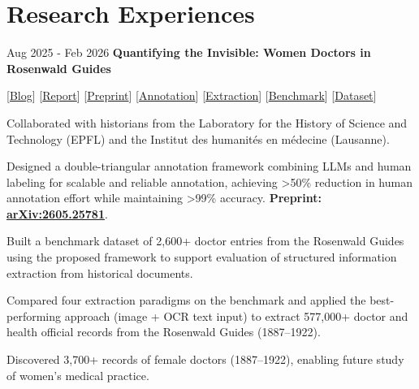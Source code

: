 \section{Research Experiences}


        \begin{twocolentry}{
            Aug 2025 - Feb 2026
        }
            \textbf{Quantifying the Invisible: Women Doctors in Rosenwald Guides} 
            
            [\href{https://medif.hypotheses.org/2006}{Blog}] [\href{https://renyi.ch/reports/rosenwald.pdf}{Report}] [\href{https://arxiv.org/abs/2605.25781}{Preprint}] [\href{https://github.com/nmrenyi/double-triangle-annotation}{Annotation}] [\href{https://github.com/nmrenyi/extraire-tesseract-openai}{Extraction}] [\href{https://github.com/nmrenyi/rosenwald-benchmark}{Benchmark}] [\href{https://github.com/nmrenyi/rosenwald-extraction}{Dataset}]
        \end{twocolentry}
        \vspace{0.10 cm}
        \begin{onecolentry}
        \begin{highlights}

    \item Collaborated with historians from the Laboratory for the History of Science and Technology (EPFL) and the Institut des humanit\'es en m\'edecine (Lausanne).
    \item Designed a double-triangular annotation framework combining LLMs and human labeling for scalable and reliable annotation, achieving >50\% reduction in human annotation effort while maintaining >99\% accuracy. \textbf{Preprint: \href{https://arxiv.org/abs/2605.25781}{arXiv:2605.25781}}.
    \item Built a benchmark dataset of 2,600+ doctor entries from the Rosenwald Guides using the proposed framework to support evaluation of structured information extraction from historical documents.
    \item Compared four extraction paradigms on the benchmark and applied the best-performing approach (image + OCR text input) to extract 577,000+ doctor and health official records from the Rosenwald Guides (1887--1922).
    \item Discovered 3,700+ records of female doctors (1887--1922), enabling future study of women's medical practice.
\end{highlights}
        \end{onecolentry}
        \vspace{0.2 cm}
